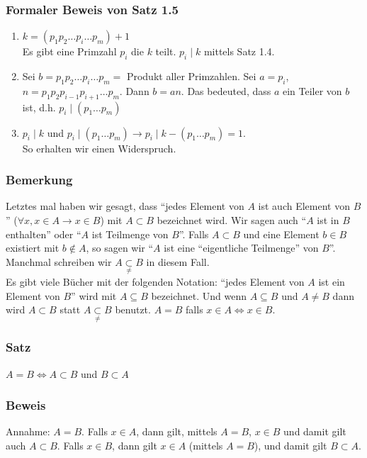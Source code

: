 \subsubsection{Formaler Beweis von Satz 1.5}

\begin{enumerate}
\item $k=\left( p_1 p_2\dots p_i \dots p_m \right)+1$\\
Es gibt eine Primzahl $p_i$ die $k$ teilt. $p_i\mid k$ mittels Satz 1.4.
\item Sei $b=p_1 p_2\dots p_i \dots p_m=$ Produkt aller Primzahlen. Sei $a=p_i$, $n=p_1 p_2 p_{i-1} p_{i+1} \dots p_m$. Dann $b=an$. Das bedeuted, dass $a$ ein Teiler von $b$ ist, d.h. $p_i\mid\left(p_1\dots p_m\right)$
\item $p_i\mid k$ und $p_i\mid \left(p_1\dots p_m\right) \to p_i \mid k-\left(p_1\dots p_m\right)=1$.\\
So erhalten wir einen Widerspruch.
\end{enumerate}

\subsubsection*{Bemerkung}
Letztes mal haben wir gesagt, dass ``jedes Element von $A$ ist auch Element von $B$'' ($\forall x,x\in A\to x\in B$) mit $A\subset B$ bezeichnet wird. Wir sagen auch ``$A$ ist in $B$ enthalten'' oder ``$A$ ist Teilmenge von $B$''. Falls $A\subset B$ und eine Element $b\in B$ existiert mit $b\not\in A$, so sagen wir ``$A$ ist eine ``eigentliche Teilmenge'' von $B$''. Manchmal schreiben wir $A\mathop  \subset \limits_{\not  = } B$ in diesem Fall. \\

Es gibt viele Bücher mit der folgenden Notation: ``jedes Element von $A$ ist ein Element von $B$'' wird mit $A\subseteq B$ bezeichnet. Und wenn $A\subseteq B$ und $A\not =B$ dann wird $A\subset B$ statt $A\mathop  \subset \limits_{\not  = } B$ benutzt. $A=B$ falls $x\in A\Leftrightarrow x\in B$. 

\subsubsection*{Satz}
$A=B \Leftrightarrow A\subset B$ und $B\subset A$ 
\subsubsection*{Beweis}
Annahme: $A=B$. Falls $x\in A$, dann gilt, mittels $A=B$, $x\in B$ und damit gilt auch $A\subset B$. Falls $x\in B$, dann gilt $x\in A$ (mittels $A=B$), und damit gilt $B\subset A$.\\

